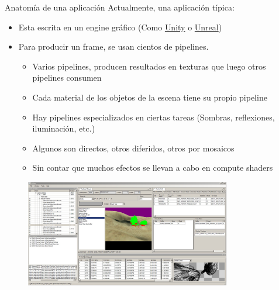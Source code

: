 \begin{frame}[allowframebreaks]{Anatomía de una aplicación}
Actualmente, una aplicación típica:
    \begin{itemize}
        \item Esta escrita en un engine gráfico (Como \href{https://unity.com/}{Unity} o \href{https://www.unrealengine.com/}{Unreal})
        \item Para producir un frame, se usan cientos de pipelines.
        \begin{itemize}
            \item Varios pipelines, producen resultados en texturas que luego otros pipelines consumen
            \item Cada material de los objetos de la escena tiene su propio pipeline
            \item Hay pipelines especializados en ciertas tareas (Sombras, reflexiones, iluminación, etc.)
            \item Algunos son directos, otros diferidos, otros por mosaicos
            \item Sin contar que muchos efectos se llevan a cabo en compute shaders
        \end{itemize}
    \end{itemize}
    \begin{figure}[htb]
        \centering
        \includegraphics[width=0.8\textwidth]{img/functionality}
    \end{figure}
\end{frame}

